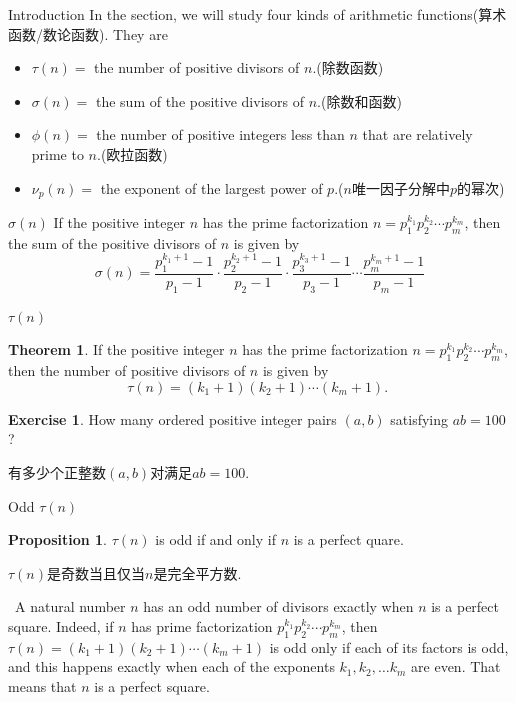 \documentclass{beamer}
\theoremstyle{definition}
\newtheorem{theo}[defn]{Theorem}
\newtheorem{exer}[defn]{Exercise}
\newtheorem{prop}[defn]{Proposition}
\newenvironment{prooff}{{\noindent\it\textcolor{cyan!40!black}{Proof}:}\,}{\par}
\begin{document}
\begin{frame}{Introduction}
    In the section, we will study four kinds of arithmetic functions(算术函数/数论函数). 
    They are 
    \begin{itemize}
        \item $\tau(n)=$ the number of positive divisors of $n$.(除数函数)
        \item $\sigma(n)=$ the sum of the positive divisors of $n$.(除数和函数)
        \item $\phi(n)=$ the number of positive integers less than $n$ that are relatively prime to $n$.(欧拉函数)
        \item $\nu_p(n)=$ the exponent of the largest power of $p$.($n$唯一因子分解中$p$的幂次)
    \end{itemize}
\end{frame}
\begin{frame}{$\sigma(n)$}
    If the positive integer $n$ has the prime factorization $n=p_1^{k_1} p_2^{k_2} \cdots p_m^{k_m}$, then the sum of the positive divisors of $n$ is given by
    $$
    \sigma(n)=\frac{p_1^{k_1+1}-1}{p_1-1} \cdot \frac{p_2^{k_2+1}-1}{p_2-1} \cdot \frac{p_3^{k_3+1}-1}{p_3-1} \cdots \frac{p_m^{k_m+1}-1}{p_m-1}
    $$
\end{frame}
\begin{frame}{$\tau(n)$}
    \begin{theo}
        If the positive integer $n$ has the prime factorization $n=p_1^{k_1} p_2^{k_2} \cdots p_m^{k_m}$, then the number of positive divisors of $n$ is given by
        $$
        \tau(n)=\left(k_1+1\right)\left(k_2+1\right) \cdots\left(k_m+1\right) \text {. }
        $$
    \end{theo}
    \begin{exer} 
      How many ordered positive integer pairs $(a,b)$ satisfying $ab=100$?

      有多少个正整数$(a,b)$对满足$ab=100$.

    \end{exer}
\end{frame}
\begin{frame}{Odd $\tau(n)$}
    \begin{prop}
        $\tau(n)$ is odd if and only if $n$ is a perfect quare.

        $\tau(n)$是奇数当且仅当$n$是完全平方数.
    \end{prop}
    \pause 
    \begin{prooff}
        A natural number $n$ has an odd number of divisors exactly when $n$ is a perfect square. Indeed, if $n$ has prime factorization $p_1^{k_1} p_2^{k_2} \cdots p_m^{k_m}$, 
        then $\tau(n)=\left(k_1+1\right)\left(k_2+1\right) \cdots\left(k_m+1\right)$ is odd only if each of its factors is odd, and this happens exactly when each of the exponents $k_1, k_2, \ldots k_m$ are even. That means that $n$ is a perfect square.
    \end{prooff}
\end{frame}
\end{document}

